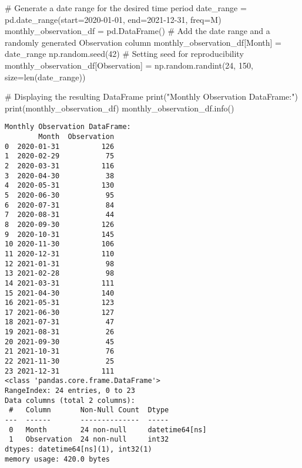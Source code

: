 \documentclass[
  letterpaper,
  DIV=11,
  numbers=noendperiod]{scrreprt}
\newenvironment{Shaded}{\begin{snugshade}}{\end{snugshade}}
\newcommand{\BuiltInTok}[1]{\textcolor[rgb]{0.00,0.23,0.31}{#1}}
\newcommand{\CommentTok}[1]{\textcolor[rgb]{0.37,0.37,0.37}{#1}}
\newcommand{\DecValTok}[1]{\textcolor[rgb]{0.68,0.00,0.00}{#1}}
\newcommand{\NormalTok}[1]{\textcolor[rgb]{0.00,0.23,0.31}{#1}}
\newcommand{\OperatorTok}[1]{\textcolor[rgb]{0.37,0.37,0.37}{#1}}
\newcommand{\StringTok}[1]{\textcolor[rgb]{0.13,0.47,0.30}{#1}}
\begin{document}
\begin{Shaded}
\begin{Highlighting}[]
\CommentTok{\# Generate a date range for the desired time period}
\NormalTok{date\_range }\OperatorTok{=}\NormalTok{ pd.date\_range(start}\OperatorTok{=}\StringTok{\textquotesingle{}2020{-}01{-}01\textquotesingle{}}\NormalTok{, end}\OperatorTok{=}\StringTok{\textquotesingle{}2021{-}12{-}31\textquotesingle{}}\NormalTok{, freq}\OperatorTok{=}\StringTok{\textquotesingle{}M\textquotesingle{}}\NormalTok{)}
\NormalTok{monthly\_observation\_df }\OperatorTok{=}\NormalTok{ pd.DataFrame()}
\CommentTok{\# Add the date range and a randomly generated \textquotesingle{}Observation\textquotesingle{} column}
\NormalTok{monthly\_observation\_df[}\StringTok{\textquotesingle{}Month\textquotesingle{}}\NormalTok{] }\OperatorTok{=}\NormalTok{ date\_range}
\NormalTok{np.random.seed(}\DecValTok{42}\NormalTok{)  }\CommentTok{\# Setting seed for reproducibility}
\NormalTok{monthly\_observation\_df[}\StringTok{\textquotesingle{}Observation\textquotesingle{}}\NormalTok{] }\OperatorTok{=}\NormalTok{ np.random.randint(}\DecValTok{24}\NormalTok{, }\DecValTok{150}\NormalTok{, size}\OperatorTok{=}\BuiltInTok{len}\NormalTok{(date\_range))}

\CommentTok{\# Displaying the resulting DataFrame}
\BuiltInTok{print}\NormalTok{(}\StringTok{"Monthly Observation DataFrame:"}\NormalTok{)}
\BuiltInTok{print}\NormalTok{(monthly\_observation\_df)}
\NormalTok{monthly\_observation\_df.info()}
\end{Highlighting}
\end{Shaded}

\begin{verbatim}
Monthly Observation DataFrame:
        Month  Observation
0  2020-01-31          126
1  2020-02-29           75
2  2020-03-31          116
3  2020-04-30           38
4  2020-05-31          130
5  2020-06-30           95
6  2020-07-31           84
7  2020-08-31           44
8  2020-09-30          126
9  2020-10-31          145
10 2020-11-30          106
11 2020-12-31          110
12 2021-01-31           98
13 2021-02-28           98
14 2021-03-31          111
15 2021-04-30          140
16 2021-05-31          123
17 2021-06-30          127
18 2021-07-31           47
19 2021-08-31           26
20 2021-09-30           45
21 2021-10-31           76
22 2021-11-30           25
23 2021-12-31          111
<class 'pandas.core.frame.DataFrame'>
RangeIndex: 24 entries, 0 to 23
Data columns (total 2 columns):
 #   Column       Non-Null Count  Dtype         
---  ------       --------------  -----         
 0   Month        24 non-null     datetime64[ns]
 1   Observation  24 non-null     int32         
dtypes: datetime64[ns](1), int32(1)
memory usage: 420.0 bytes
\end{verbatim}
\end{document}
